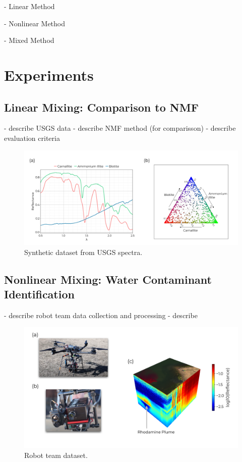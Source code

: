 \documentclass[remotesensing,article,submit,pdftex,moreauthors]{Definitions/mdpi}
\begin{document}
- Linear Method

- Nonlinear Method

- Mixed Method


\section{Experiments}
\subsection{Linear Mixing: Comparison to NMF}
- describe USGS data
- describe NMF method (for comparisson)
- describe evaluation criteria


\begin{figure}[H]
\includegraphics[width=\columnwidth]{methods/usgs/usgs-dataset.pdf}
\caption{Synthetic dataset from USGS spectra. \label{fig:usgs-data}}
\end{figure}  




\subsection{Nonlinear Mixing: Water Contaminant Identification}
- describe robot team data collection and processing
- describe 



\begin{figure}[H]
\includegraphics[width=\columnwidth]{methods/robot-team/robot-team-overview.pdf}
\caption{Robot team dataset. \label{fig:robotteam-data}}
\end{figure}  
\end{document}
